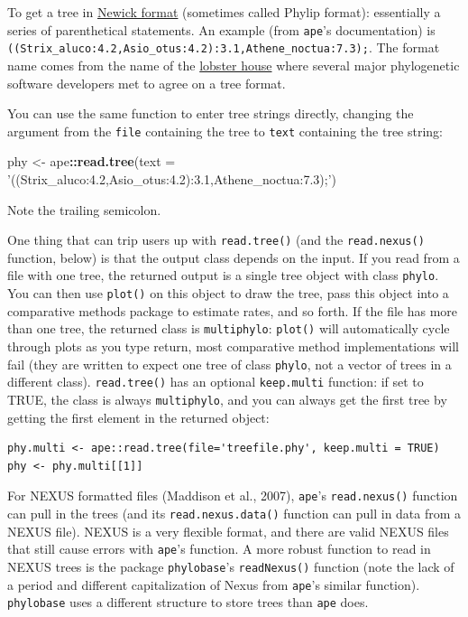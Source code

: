 \documentclass[]{article}
\newenvironment{Shaded}{\begin{snugshade}}{\end{snugshade}}
\newcommand{\DataTypeTok}[1]{\textcolor[rgb]{0.13,0.29,0.53}{#1}}
\newcommand{\KeywordTok}[1]{\textcolor[rgb]{0.13,0.29,0.53}{\textbf{#1}}}
\newcommand{\NormalTok}[1]{#1}
\newcommand{\OperatorTok}[1]{\textcolor[rgb]{0.81,0.36,0.00}{\textbf{#1}}}
\newcommand{\StringTok}[1]{\textcolor[rgb]{0.31,0.60,0.02}{#1}}
\begin{document}
To get a tree in \href{http://evolution.genetics.washington.edu/phylip/newicktree.html}{Newick format} (sometimes called Phylip format): essentially a series of parenthetical statements. An example (from \texttt{ape}'s documentation) is \texttt{((Strix\_aluco:4.2,Asio\_otus:4.2):3.1,Athene\_noctua:7.3);}. The format name comes from the name of the \href{http://newicks.com}{lobster house} where several major phylogenetic software developers met to agree on a tree format.

You can use the same function to enter tree strings directly, changing the argument from the \texttt{file} containing the tree to \texttt{text} containing the tree string:

\begin{Shaded}
\begin{Highlighting}[]
\NormalTok{phy <-}\StringTok{ }\NormalTok{ape}\OperatorTok{::}\KeywordTok{read.tree}\NormalTok{(}\DataTypeTok{text =} \StringTok{'((Strix_aluco:4.2,Asio_otus:4.2):3.1,Athene_noctua:7.3);'}\NormalTok{)}
\end{Highlighting}
\end{Shaded}

Note the trailing semicolon.

One thing that can trip users up with \texttt{read.tree()} (and the \texttt{read.nexus()} function, below) is that the output class depends on the input. If you read from a file with one tree, the returned output is a single tree object with class \texttt{phylo}. You can then use \texttt{plot()} on this object to draw the tree, pass this object into a comparative methods package to estimate rates, and so forth. If the file has more than one tree, the returned class is \texttt{multiphylo}: \texttt{plot()} will automatically cycle through plots as you type return, most comparative method implementations will fail (they are written to expect one tree of class \texttt{phylo}, not a vector of trees in a different class). \texttt{read.tree()} has an optional \texttt{keep.multi} function: if set to TRUE, the class is always \texttt{multiphylo}, and you can always get the first tree by getting the first element in the returned object:

\begin{verbatim}
phy.multi <- ape::read.tree(file='treefile.phy', keep.multi = TRUE)
phy <- phy.multi[[1]]
\end{verbatim}

For NEXUS formatted files (Maddison et al., 2007), \texttt{ape}'s \texttt{read.nexus()} function can pull in the trees (and its \texttt{read.nexus.data()} function can pull in data from a NEXUS file). NEXUS is a very flexible format, and there are valid NEXUS files that still cause errors with \texttt{ape}'s function. A more robust function to read in NEXUS trees is the package \texttt{phylobase}'s \texttt{readNexus()} function (note the lack of a period and different capitalization of Nexus from \texttt{ape}'s similar function). \texttt{phylobase} uses a different structure to store trees than \texttt{ape} does.
\end{document}
